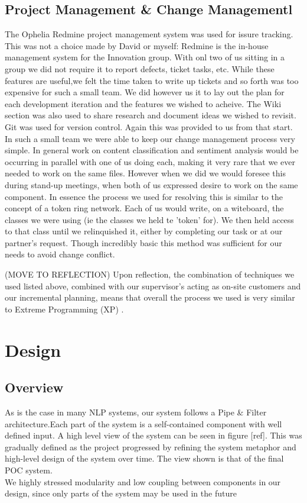 \documentclass[a4paper,11pt]{report}
\begin{document}
\section{Project Management \& Change Managementl}
The Ophelia Redmine project management system was used for issure tracking. This was not a choice made by David or myself: Redmine is the in-house management system for the Innovation group. With onl two of us sitting in a group we did not require it to report defects, ticket tasks, etc. While these features are useful,we felt the time taken to write up tickets and so forth was too expensive for such a small team.  We did however us it to lay out the plan for each development iteration and the features we wished to acheive. The Wiki section was also used to share research and document ideas we wished to revisit.\\
Git was used for version control. Again this was provided to us from that start.\\
In such a small team we were able to keep our change management process very simple. In general work on content classification and sentiment analysis would be occurring in parallel with one of us doing each, making it very rare that we ever needed to work on the same files. However when we did we would foresee this during stand-up meetings, when both of us expressed desire to work on the same component. In essence the process we used for resolving this is similar to the concept of a token ring network\cite{TokenRing}. Each of us would write, on a witeboard, the classes we were using (ie the classes we held te 'token' for). We then held access to that class until we relinquished it, either by completing our task or at our partner's request. Though incredibly basic this method was sufficient for our needs to avoid change conflict.

(MOVE TO REFLECTION)
Upon reflection, the combination of techniques we used listed above, combined with our supervisor's acting as on-site customers and our incremental planning, means that overall the process we used is very similar to Extreme Programming (XP) \cite[pg.~66]{Sommerville}.

\chapter{Design}
\section{Overview}
As is the case in many NLP systems, our system follows a Pipe \& Filter architecture.Each part of the system is a self-contained component with well defined input. A high level view of the system can be seen in figure [ref]. This was gradually defined as the project progressed by refining the system metaphor and high-level design of the system over time. The view shown is that of the final POC system.\\
We highly stressed modularity and low coupling between components in our design, since only parts of the system may be used in the future
\end{document}
